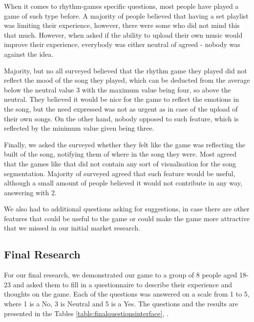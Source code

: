When it comes to rhythm-games specific questions, most people have played a game of such type before. A majority of people believed that having a set playlist was limiting their experience, however, there were some who did not mind this that much. However, when asked if the ability to upload their own music would improve their experience, everybody was either neutral of agreed - nobody was against the idea. 

Majority, but no all surveyed believed that the rhythm game they played did not reflect the mood of the song they played, which can be deducted from the average below the neutral value 3 with the maximum value being four, so above the neutral. They believed it would be nice for the game to reflect the emotions in the song, but the need expressed was not as urgent as in case of the upload of their own songs. On the other hand, nobody opposed to such feature, which is reflected by the minimum value given being three.

Finally, we asked the surveyed whether they felt like the game was reflecting the built of the song, notifying them of where in the song they were. Most agreed that the games like that did not contain any sort of visualisation for the song segmentation. Majority of surveyed agreed that such feature would be useful, although a small amount of people believed it would not contribute in any way, answering with 2.

We also had to additional questions asking for suggestions, in case there are other features that could be useful to the game or could make the game more attractive that we missed in our initial market research. 

\subsection*{Final Research}

For our final research, we demonstrated our game to a group of 8 people aged 18-23 and asked them to fill in a questionnaire to describe their experience and thoughts on the game. Each of the questions was answered on a scale from 1 to 5, where 1 is a No,  3 is Neutral and 5 is a Yes. The questions and the results are presented in the Tables \ref{table:finalquestionsinterface}, .

